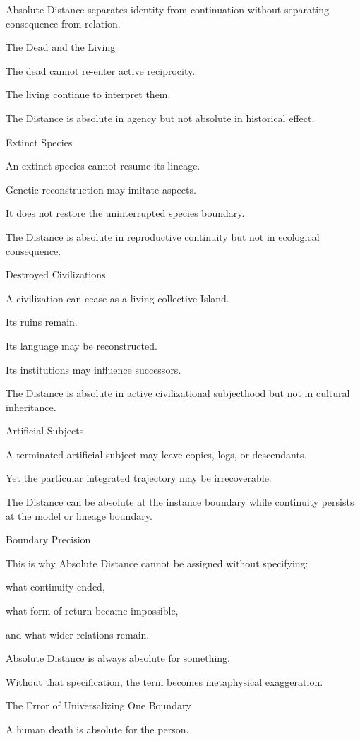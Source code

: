 Absolute Distance separates identity from continuation without separating consequence from relation.

The Dead and the Living

The dead cannot re-enter active reciprocity.

The living continue to interpret them.

The Distance is absolute in agency but not absolute in historical effect.

Extinct Species

An extinct species cannot resume its lineage.

Genetic reconstruction may imitate aspects.

It does not restore the uninterrupted species boundary.

The Distance is absolute in reproductive continuity but not in ecological consequence.

Destroyed Civilizations

A civilization can cease as a living collective Island.

Its ruins remain.

Its language may be reconstructed.

Its institutions may influence successors.

The Distance is absolute in active civilizational subjecthood but not in cultural inheritance.

Artificial Subjects

A terminated artificial subject may leave copies, logs, or descendants.

Yet the particular integrated trajectory may be irrecoverable.

The Distance can be absolute at the instance boundary while continuity persists at the model or lineage boundary.

Boundary Precision

This is why Absolute Distance cannot be assigned without specifying:

what continuity ended,

what form of return became impossible,

and what wider relations remain.

Absolute Distance is always absolute for something.

Without that specification, the term becomes metaphysical exaggeration.

The Error of Universalizing One Boundary

A human death is absolute for the person.


